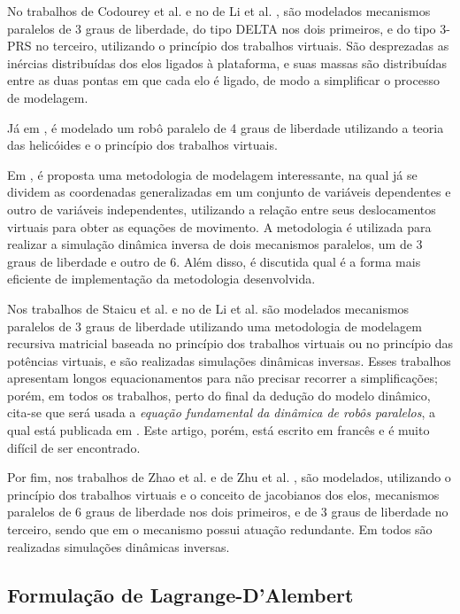 \documentclass[]{politex}
\begin{document}
No trabalhos de Codourey et al. \cite{Codourey, CodoureyBurdet} e no de Li et al. \cite{Li}, são modelados mecanismos paralelos de 3 graus de liberdade, do tipo DELTA nos dois primeiros, e do tipo 3-PRS no terceiro, utilizando o princípio dos trabalhos virtuais. São desprezadas as inércias distribuídas dos elos ligados à plataforma, e suas massas são distribuídas entre as duas pontas em que cada elo é ligado, de modo a simplificar o processo de modelagem.

Já em \cite{GallardoAlvarado}, é modelado um robô paralelo de 4 graus de liberdade utilizando a teoria das helicóides e o princípio dos trabalhos virtuais.

Em \cite{Geike}, é proposta uma metodologia de modelagem interessante, na qual já se dividem as coordenadas generalizadas em um conjunto de variáveis dependentes e outro de variáveis independentes, utilizando a relação entre seus deslocamentos virtuais para obter as equações de movimento. A metodologia é utilizada para realizar a simulação dinâmica inversa de dois mecanismos paralelos, um de 3 graus de liberdade e outro de 6. Além disso, é discutida qual é a forma mais eficiente de implementação da metodologia desenvolvida.

Nos trabalhos de Staicu et al. \cite{Staicu, Staicu2, Staicu3, StaicuCarpCiocardia, StaicuLiu, StaicuZhang, StaicuZhangRugescu} e no de Li et al. \cite{LiStaicu} são modelados mecanismos paralelos de 3 graus de liberdade utilizando uma metodologia de modelagem recursiva matricial baseada no princípio dos trabalhos virtuais ou no princípio das potências virtuais, e são realizadas simulações dinâmicas inversas. Esses trabalhos apresentam longos equacionamentos para não precisar recorrer a simplificações; porém, em todos os trabalhos, perto do final da dedução do modelo dinâmico, cita-se que será usada a \emph{equação fundamental da dinâmica de robôs paralelos}, a qual está publicada em \cite{StaicuFrances}. Este artigo, porém, está escrito em francês e é muito difícil de ser encontrado.

Por fim, nos trabalhos de Zhao et al. \cite{Zhao, Zhao2} e de Zhu et al. \cite{Zhu}, são modelados, utilizando o princípio dos trabalhos virtuais e o conceito de jacobianos dos elos, mecanismos paralelos de 6 graus de liberdade nos dois primeiros, e de 3 graus de liberdade no terceiro, sendo que em \cite{Zhao2} o mecanismo possui atuação redundante. Em todos são realizadas simulações dinâmicas inversas.

\subsection{Formulação de Lagrange-D’Alembert}
\end{document}
